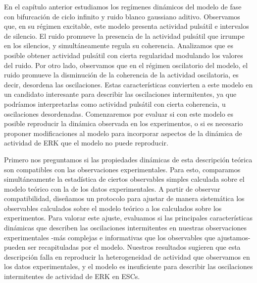 \documentclass[./main.tex]{subfiles}
\begin{document}
En el capítulo anterior estudiamos los regímenes dinámicos del modelo de fase con bifurcación de ciclo infinito y ruido blanco gaussiano aditivo. Observamos que, en su régimen excitable, este modelo presenta actividad pulsátil e intervalos de silencio. El ruido promueve la presencia de la actividad pulsátil que irrumpe en los silencios, y simultáneamente regula su coherencia. Analizamos que es posible obtener actividad pulsátil con cierta regularidad modulando los valores del ruido. Por otro lado, observamos que en el régimen oscilatorio del modelo, el ruido promueve la disminución de la coherencia de la actividad oscilatoria, es decir, desordena las oscilaciones. Estas características convierten a este modelo en un candidato interesante para describir las oscilaciones intermitentes, ya que podríamos interpretarlas como actividad pulsátil con cierta coherencia, u oscilaciones desordenadas. Comenzaremos por evaluar si con este modelo es posible reproducir la dinámica observada en los experimentos, o si es necesario proponer modificaciones al modelo para incorporar aspectos de la dinámica de actividad de ERK que el modelo no puede reproducir.


Primero nos preguntamos si las propiedades dinámicas de esta descripción teórica son compatibles con las observaciones experimentales. Para esto, comparamos simultáneamente la estadística de ciertos observables simples calculada sobre el modelo teórico con la de los datos experimentales. A partir de observar compatibilidad, diseñamos un protocolo para ajustar de manera sistemática los observables calculados sobre el modelo teórico a los calculados sobre los experimentos. Para valorar este ajuste, evaluamos si las principales características dinámicas que describen las oscilaciones intermitentes en nuestras observaciones experimentales -más complejas e informativas que los observables que ajustamos- pueden ser recapituladas por el modelo. Nuestros resultados sugieren que esta descripción falla en reproducir la heterogeneidad de actividad que observamos en los datos experimentales, y el modelo es insuficiente para describir las oscilaciones intermitentes de actividad de ERK en ESCs. 
\end{document}
